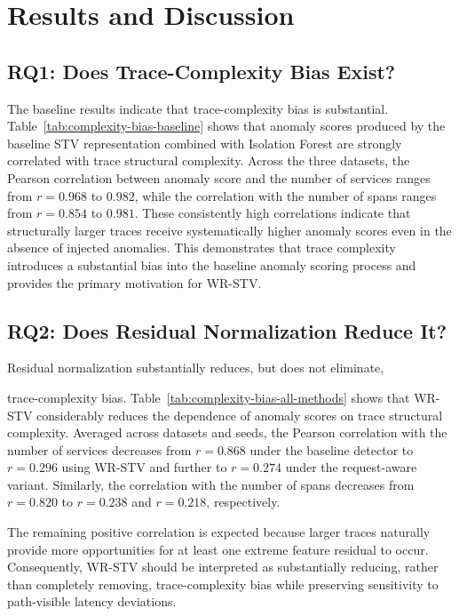 \section{Results and Discussion}
\label{sec:results}

\subsection{RQ1: Does Trace-Complexity Bias Exist?}

The baseline results indicate that trace-complexity bias is substantial.
Table~\ref{tab:complexity-bias-baseline} shows that anomaly scores
produced by the baseline STV representation combined with Isolation
Forest are strongly correlated with trace structural complexity. Across
the three datasets, the Pearson correlation between anomaly score and
the number of services ranges from \(r=0.968\) to \(0.982\), while the
correlation with the number of spans ranges from \(r=0.854\) to
\(0.981\). These consistently high correlations indicate that
structurally larger traces receive systematically higher anomaly scores
even in the absence of injected anomalies. This demonstrates that trace
complexity introduces a substantial bias into the baseline anomaly
scoring process and provides the primary motivation for WR-STV.

\subsection{RQ2: Does Residual Normalization Reduce It?}

Residual normalization substantially reduces, but does not eliminate,

trace-complexity bias. Table~\ref{tab:complexity-bias-all-methods} shows that
WR-STV considerably reduces the dependence of anomaly scores on trace
structural complexity. Averaged across datasets and seeds, the Pearson
correlation with the number of services decreases from \(r=0.868\)
under the baseline detector to \(r=0.296\) using WR-STV and further to
\(r=0.274\) under the request-aware variant. Similarly, the correlation
with the number of spans decreases from \(r=0.820\) to \(r=0.238\) and
\(r=0.218\), respectively.

The remaining positive correlation is expected because larger traces
naturally provide more opportunities for at least one extreme feature
residual to occur. Consequently, WR-STV should be interpreted as
substantially reducing, rather than completely removing,
trace-complexity bias while preserving sensitivity to path-visible
latency deviations.

